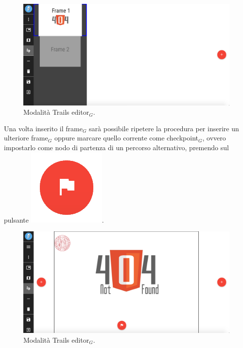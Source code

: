 \begin{figure}[!h]
\begin{center}
\includegraphics[scale=0.35]{img/trail_frames_list.png}
\caption{Modalità Trails editor$_G$.}
\end{center}
\end{figure}

Una volta inserito il frame$_G$ sarà possibile ripetere la procedura per inserire un ulteriore frame$_G$ oppure marcare quello corrente come checkpoint$_G$, ovvero impostarlo come nodo di partenza di un percorso alternativo, premendo sul pulsante \includegraphics[scale=0.4]{img/checkpoint.png}.\\

\begin{figure}[!h]
\begin{center}
\includegraphics[scale=0.35]{img/trail_frame.png}
\caption{Modalità Trails editor$_G$.}
\end{center}
\end{figure}

